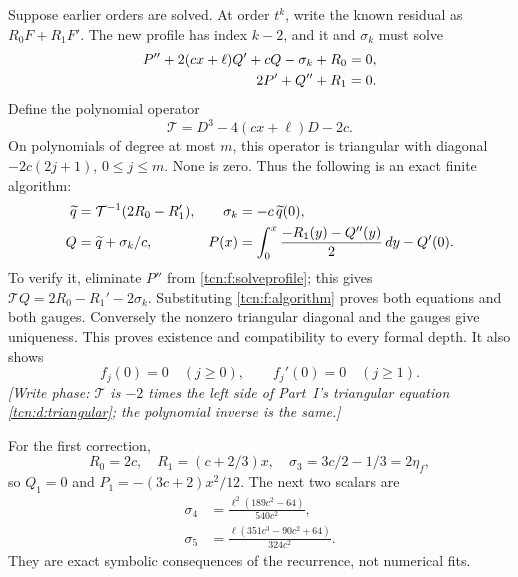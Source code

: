 \documentclass[11pt,letterpaper]{article}
\theoremstyle{remark}
\begin{document}
Suppose earlier orders are solved. At order $t^k$, write the known residual as $R_0F+R_1F'$. The new profile has index $k-2$, and it and $\sigma_k$ must solve
\begin{align}
 P''+2(cx+\ell)Q'+cQ-\sigma_k+R_0&=0,\notag\\
 2P'+Q''+R_1&=0.\label{tcn:f:solveprofile}
\end{align}
Define the polynomial operator
\[
 \mathcal T=D^3-4(cx+\ell)D-2c.
\]
On polynomials of degree at most $m$, this operator is triangular with diagonal $-2c(2j+1)$, $0\le j\le m$. None is zero. Thus the following is an exact finite algorithm:
\begin{align}
 \widetilde q&=\mathcal T^{-1}(2R_0-R_1'),&
 \sigma_k&=-c\,\widetilde q(0),\notag\\
 Q&=\widetilde q+\sigma_k/c,&
 P(x)&=\int_0^x\frac{-R_1(y)-Q''(y)}2\,dy-Q'(0).\label{tcn:f:algorithm}
\end{align}
To verify it, eliminate $P''$ from \eqref{tcn:f:solveprofile}; this gives
$\mathcal TQ=2R_0-R_1'-2\sigma_k$. Substituting \eqref{tcn:f:algorithm} proves both equations and both gauges. Conversely the nonzero triangular diagonal and the gauges give uniqueness. This proves existence and compatibility to every formal depth. It also shows
\[
 f_j(0)=0\quad(j\ge0),\qquad f_j'(0)=0\quad(j\ge1).
\]
\emph{[Write phase: $\mathcal T$ is $-2$ times the left side of Part~I's triangular equation \eqref{tcn:d:triangular}; the polynomial inverse is the same.]}

For the first correction,
\[
 R_0=2c,\quad R_1=(c+2/3)x,\quad
 \sigma_3=3c/2-1/3=2\eta_f,
\]
so $Q_1=0$ and $P_1=-(3c+2)x^2/12$. The next two scalars are
\begin{align}
 \sigma_4&=\frac{\ell^2(189c^2-64)}{540c^2},\label{tcn:f:sigma4}\\
 \sigma_5&=\frac{\ell(351c^3-90c^2+64)}{324c^2}.\label{tcn:f:sigma5}
\end{align}
They are exact symbolic consequences of the recurrence, not numerical fits.
\end{document}
